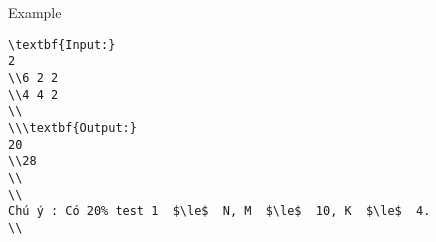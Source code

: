 Example  
\begin{verbatim}
\textbf{Input:}
2
\\6 2 2
\\4 4 2
\\
\\\textbf{Output:}
20
\\28 
\\
\\
Chú ý : Có 20% test 1  $\le$  N, M  $\le$  10, K  $\le$  4.
\\\end{verbatim}